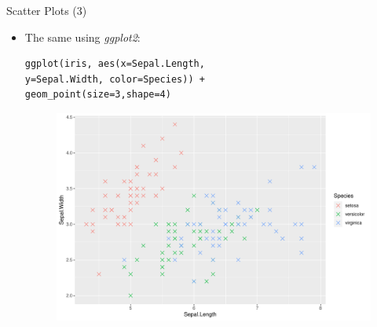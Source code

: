\documentclass[handout]{beamer}
\begin{document}
\begin{frame}[fragile]{Scatter Plots (3)}
\scriptsize{
\begin{itemize}
 \item The same using \emph{ggplot2}:
 \begin{verbatim}
ggplot(iris, aes(x=Sepal.Length,
y=Sepal.Width, color=Species)) + 
geom_point(size=3,shape=4)
 \end{verbatim}

  \begin{figure}[h!]
	\centering
	\includegraphics[scale=0.35]{pics/scatterggplot2.pdf}		
\end{figure} 
 
 
\end{itemize}




}
\end{frame}
\end{document}
